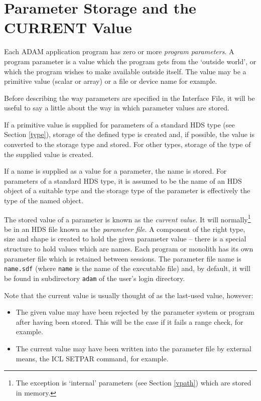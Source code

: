 \documentclass[twoside,11pt,nolof]{starlink}
\begin{document}
\section{Parameter Storage and the CURRENT Value
\label{current}}

Each ADAM application program has zero or more \emph{program parameters}.
A program parameter is a value which the program gets
from the `outside world', or which the program wishes to make available
outside itself. The value may be a primitive value (scalar or array) or a file
or device name for example.

Before describing the way parameters are specified in the Interface File, it
will be useful to say a little about the way in which parameter values are
stored.

If a primitive value is supplied for parameters of a standard HDS type
(see Section \ref{type}),
storage of the defined type is created and, if possible, the value is
converted to the storage type and stored.
For other types, storage of the type of the supplied value is created.

If a name is supplied as a value for a parameter, the name is stored.
For parameters of a standard HDS type, it is assumed to be the name of an HDS
object of a suitable type and the storage type of the parameter is effectively
the type of the named object.

The stored value of a parameter is known as the \emph{current value}. It will
normally\footnote{The exception is `internal' parameters (see Section
\ref{vpath}) which are stored in memory.} be in an HDS file known as the
\emph{parameter file}.
A component of the right type, size and shape is created to hold the given
parameter value -- there is a special structure to hold values which are names.
Each program or monolith has its own parameter file which is retained between
sessions. The parameter file name is \texttt{name.sdf} (where \texttt{name} is the
name of the executable file) and, by default, it will be found in subdirectory
\texttt{adam} of the user's login directory.

Note that the current value is usually thought of as the last-used value,
however:
\begin{itemize}
\item The given value may have been rejected by the parameter system or program
after having been stored. This will be the case if it fails a range check, for
example.
\item The current value may have been written into the parameter file by
external means, the ICL SETPAR command, for example.
\end{itemize}
\end{document}
